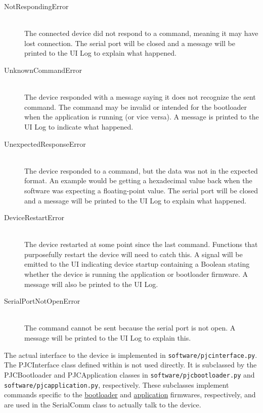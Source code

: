 \documentclass{article}
\begin{document}
\begin{description}
  \item[NotRespondingError] \hfill \\
    The connected device did not respond to a command, meaning it may have lost connection. The
    serial port will be closed and a message will be printed to the UI Log to explain what happened.
  \item[UnknownCommandError] \hfill \\
    The device responded with a message saying it does not recognize the sent command.  The command
    may be invalid or intended for the bootloader when the application is running (or vice versa).
    A message is printed to the UI Log to indicate what happened.
  \item[UnexpectedResponseError] \hfill \\
    The device responded to a command, but the data was not in the expected format.  An example
    would be getting a hexadecimal value back when the software was expecting a floating-point
    value.  The serial port will be closed and a message will be printed to the UI Log to explain
    what happened.
  \item[DeviceRestartError] \hfill \\
    The device restarted at some point since the last command.  Functions that purposefully restart
    the device will need to catch this.  A signal will be emitted to the UI indicating device
    startup containing a Boolean stating whether the device is running the application or bootloader
    firmware.  A message will also be printed to the UI Log.
  \item[SerialPortNotOpenError] \hfill \\
    The command cannot be sent because the serial port is not open.  A message will be printed to
    the UI Log to explain this.
\end{description}

The actual interface to the device is implemented in \texttt{software/pjcinterface.py}.  The
PJCInterface class defined within is not used directly.  It is subclassed by the PJCBootloader and
PJCApplication classes in \texttt{software/pjcbootloader.py} and
\texttt{software/pjcapplication.py}, respectively.  These subclasses implement commands specific to
the \hyperref[sssec:FWBootCommands]{bootloader} and \hyperref[sssec:FWAppCommands]{application}
firmwares, respectively, and are used in the SerialComm class to actually talk to the device.
\end{document}
